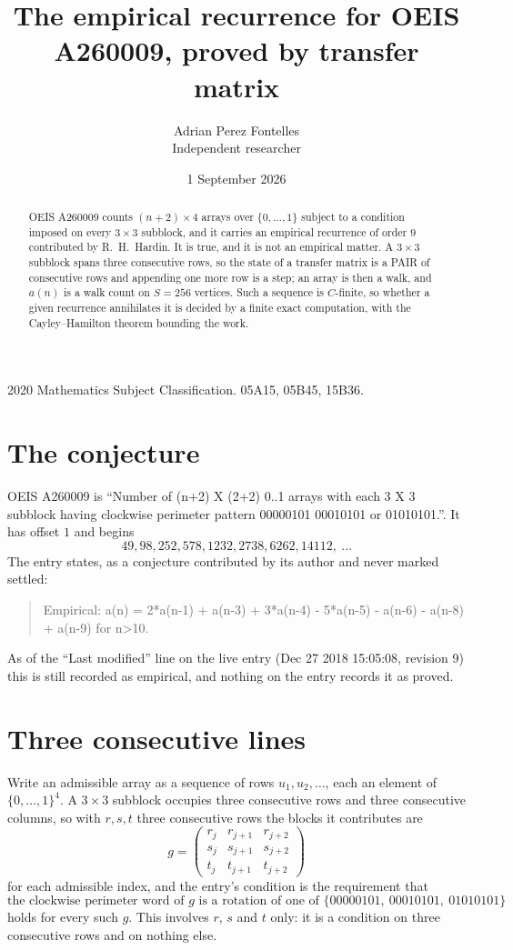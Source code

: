 \documentclass[11pt,a4paper]{article}
\title{The empirical recurrence for OEIS A260009, proved by transfer matrix}
\author{Adrian Perez Fontelles\\ \small Independent researcher}
\date{1 September 2026}
\theoremstyle{plain}
\theoremstyle{definition}
\begin{document}
\maketitle

\begin{abstract}
OEIS A260009 counts $(n+2)\times4$ arrays over $\{0,\dots,1\}$ subject to a condition imposed on
every $3\times3$ subblock, and it carries an empirical recurrence of order $9$
contributed by R.~H.~Hardin. It is true, and it is not an empirical matter. A $3\times3$
subblock spans three consecutive rows, so the state of a transfer matrix is a PAIR of
consecutive rows and appending one more row is a step; an array is then a walk, and
$a(n)$ is a walk count on $S=256$ vertices. Such a sequence is $C$-finite, so whether a given
recurrence annihilates it is decided by a finite exact computation, with the Cayley--Hamilton
theorem bounding the work.
\end{abstract}

\noindent\small 2020 Mathematics Subject Classification. 05A15, 05B45, 15B36.\normalsize

\section{The conjecture}

OEIS A260009 is ``Number of (n+2) X (2+2) 0..1 arrays with each 3 X 3 subblock having clockwise perimeter pattern 00000101 00010101 or 01010101.''. It has offset $1$ and begins
\[
49, 98, 252, 578, 1232, 2738, 6262, 14112,\ \dots
\]
The entry states, as a conjecture contributed by its author and never marked settled:
\begin{quote}
Empirical: a(n) = 2*a(n-1) + a(n-3) + 3*a(n-4) - 5*a(n-5) - a(n-6) - a(n-8) + a(n-9) for n>10.
\end{quote}
As of the ``Last modified'' line on the live entry (Dec 27 2018 15:05:08, revision 9) this is still
recorded as empirical, and nothing on the entry records it as proved.

\section{Three consecutive lines}

Write an admissible array as a sequence of rows $u_1,u_2,\dots$, each an element of
$\{0,\dots,1\}^{4}$. A $3\times3$ subblock occupies three consecutive rows and
three consecutive columns, so with $r,s,t$ three consecutive rows the blocks it
contributes are
\[
g=\begin{pmatrix}r_j&r_{j+1}&r_{j+2}\\ s_j&s_{j+1}&s_{j+2}\\ t_j&t_{j+1}&t_{j+2}\end{pmatrix}
\]
for each admissible index, and the entry's condition is the requirement that
\[
\text{the clockwise perimeter word of }g\text{ is a rotation of one of }\{00000101,\ 00010101,\ 01010101\}
\]
holds for every such $g$. This involves $r$, $s$ and $t$ only: it is a condition on
three consecutive rows and on nothing else.
\end{document}

